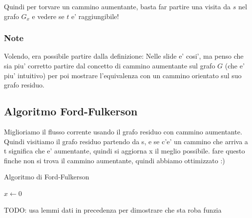 Quindi per torvare un cammino aumentante, basta far partire una visita da $ s  $ nel grafo $ G_x $ e vedere se $ t $ e' raggiungibile!

\subsubsection{Note}
Volendo, era possibile partire dalla definizione:
Nelle slide e' cosi', ma penso che sia piu' corretto partire dal concetto di cammino aumentante sul grafo $ G $ (che e' piu' intuitivo) per poi mostrare l'equivalenza con un cammino orientato sul suo grafo residuo.


\subsection{Algoritmo Ford-Fulkerson}

Miglioriamo il flusso corrente usando il grafo residuo con cammino aumentante. Quindi visitiamo il grafo residuo partendo da s, e se c'e' un cammino che arriva a t significa che e' aumentante, quindi si aggiorna x il meglio possibile. fare questo finche non si trova il cammino aumentante, quindi abbiamo ottimizzato :)

\begin{algorithm}
  \caption{Algoritmo di Ford-Fulkerson}

  $x \gets 0$\;

\end{algorithm}

TODO: usa lemmi dati in precedenza per dimostrare che sta roba funzia

